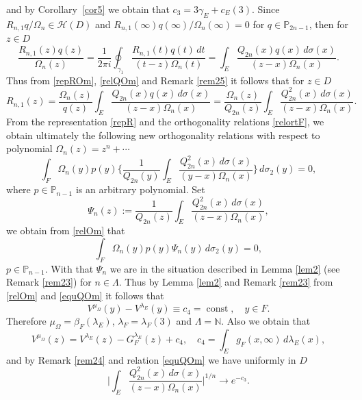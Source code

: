 \documentclass[11pt, a4paper, twoside]{article}
\def\NN{\mathbb N}
\def\PP{\mathbb P}
\def\HH{\mathscr H}
\def\const{\operatorname{const}}
\theoremstyle{plain}
\theoremstyle{definition}
\begin{document}
and by Corollary~\ref{cor5} we obtain that $c_3=3\gamma_E+c_E(3)$.
Since $R_{n,1}q/\Omega_n\in\HH(D)$ and  $R_{n,1}(\infty)q(\infty)/\Omega_n(\infty)=0$ for $q\in\PP_{2n-1}$, then for $z\in D$
\begin{equation}
\frac{R_{n,1}(z)q(z)}{\Omega_n(z)}
=\frac1{2 \pi i}
\oint_{\gamma_1}\frac{R_{n,1}(t)q(t)\,dt}
{(t-z)\Omega_n(t)}
=\int_E\frac{Q_{2n}(x)q(x)\,d\sigma(x)}
{(z-x)\Omega_n(x)}.
\label{repROm}
\end{equation}
Thus from \eqref{repROm}, \eqref{relQOm} and Remark \ref{rem25} it follows that for $z\in D$
\begin{equation}
R_{n,1}(z)=\frac{\Omega_n(z)}{q(z)}
\int_E \frac{Q_{2n}(x)q(x)\,d\sigma(x)}{(z-x)\Omega_n(x)}
=\frac{\Omega_n(z)}{Q_{2n}(z)}
\int_E\frac{Q_{2n}^2(x)\,d\sigma(x)}
{(z-x)\Omega_n(x)}.
\label{repR}
\end{equation}
From the representation \eqref{repR} and the orthogonality relations \eqref{relortF}, we obtain ultimately the following new orthogonality relations with respect to polynomial $\Omega_n(z)=z^n+\dotsb$
\begin{equation}
\int_F\Omega_n(y)p(y)\biggl\{\frac1{Q_{2n}(y)}
\int_E \frac{Q_{2n}^2(x)\,d\sigma(x)}{(y-x)\Omega_n(x)}\biggr\}\,d\sigma_2(y)=0,
\label{relOm}
\end{equation}
where $p\in\PP_{n-1}$ is an arbitrary polynomial. Set
\begin{equation}
\Psi_n(z):=\frac1{Q_{2n}(z)}
\int_E \frac{Q_{2n}^2(x)\,d\sigma(x)}{(z-x)\Omega_n(x)},
\label{repPsi}
\end{equation}
we obtain from \eqref{relOm} that
\begin{equation}
\int_F\Omega_n(y)p(y)\Psi_n(y)
\,d\sigma_2(y)=0,
\label{relOmPsi}
\end{equation}
$p\in\PP_{n-1}$. With that $\Psi_n$ we are in the situation  described in Lemma \ref{lem2}
(see Remark \ref{rem23}) for $n\in\Lambda$.
Thus by Lemma \ref{lem2} and Remark \ref{rem23} from \eqref{relOm} and \eqref{equQOm} it follows that
\begin{equation}
V^{\mu_\Omega}(y)-V^{\lambda_E}(y)\equiv c_4=\const,
\quad y\in F.
\label{equOmQ}
\end{equation}
Therefore  ${\mu_\Omega}=\beta_F(\lambda_E)$, $\lambda_F=\lambda_F(3)$ and $\Lambda=\NN$. Also we obtain that
\begin{equation}
V^{\mu_\Omega}(z)=V^{\lambda_E}(z)-G^{\lambda_E}_F(z)+c_4,
\quad
c_4=\int_E g_F(x,\infty)\,d\lambda_E(x),
\label{equOmQ2}
\end{equation}
and by Remark \ref{rem24} and relation \eqref{equQOm} we have uniformly in $D$ 
\begin{equation}
\biggl|\int_E \frac{Q_{2n}^2(x)\,d\sigma(x)}{(z-x)\Omega_n(x)}\biggr|^{1/n}\to e^{-c_3}.
\label{err}
\end{equation}
\end{document}
